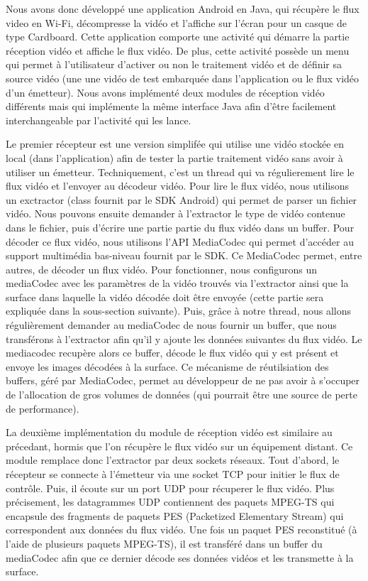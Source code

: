 \documentclass[11pt,a4paper]{article}
\begin{document}
\bigbreak
Nous avons donc développé une application Android en Java, qui récupère le flux video en Wi-Fi, décompresse la vidéo et l'affiche sur l'écran pour un casque de type Cardboard.
Cette application comporte une activité qui démarre la partie réception vidéo et affiche le flux vidéo. De plus, cette activité possède un menu qui permet à l'utilisateur d'activer ou non le traitement vidéo et de définir sa source vidéo (une une vidéo de test embarquée dans l'application ou le flux vidéo d'un émetteur).
Nous avons implémenté deux modules de réception vidéo différents mais qui implémente la même interface Java afin d'être facilement interchangeable par l'activité qui les lance.

\bigbreak
Le premier récepteur est une version simplifée qui utilise une vidéo stockée en local (dans l'application) afin de tester la partie traitement vidéo sans avoir à utiliser un émetteur.
Techniquement, c'est un thread qui va régulierement lire le flux vidéo et l'envoyer au décodeur vidéo. 
Pour lire le flux vidéo, nous utilisons un exctractor (class fournit par le SDK Android) qui permet de parser un fichier vidéo. Nous pouvons ensuite demander à l'extractor le type de vidéo contenue dans le fichier, puis d'écrire une partie partie du flux vidéo dans un buffer.
Pour décoder ce flux vidéo, nous utilisons l'API MediaCodec qui permet d'accéder au support multimédia bas-niveau fournit par le SDK. Ce MediaCodec permet, entre autres, de décoder un flux vidéo.
Pour fonctionner, nous configurons un mediaCodec avec les paramètres de la vidéo trouvés via l'extractor ainsi que la surface dans laquelle la vidéo décodée doit être envoyée (cette partie sera expliquée dans la sous-section suivante).
Puis, grâce à notre thread, nous allons régulièrement demander au mediaCodec de nous fournir un buffer, que nous transférons à l'extractor afin qu'il y ajoute les données suivantes du flux vidéo.
Le mediacodec recupère alors ce buffer, décode le flux vidéo qui y est présent et envoye les images décodées à la surface.
Ce mécanisme de réutilsiation des buffers, géré par MediaCodec, permet au développeur de ne pas avoir à s'occuper de l'allocation de gros volumes de données (qui pourrait être une source de perte de performance). 

\bigbreak
La deuxième implémentation du module de réception vidéo est similaire au précedant, hormis que l'on récupère le flux vidéo sur un équipement distant.
Ce module remplace donc l'extractor par deux sockets réseaux.
Tout d'abord, le récepteur se connecte à l'émetteur via une socket TCP pour initier le flux de contrôle.
Puis, il écoute sur un port UDP pour récuperer le flux vidéo.
Plus précisement, les datagrammes UDP contiennent des paquets MPEG-TS qui encapsule des fragments de paquets PES (Packetized Elementary Stream) qui correspondent aux données du flux vidéo.
Une fois un paquet PES reconstitué (à l'aide de plusieurs paquets MPEG-TS), il est transféré dans un buffer du mediaCodec afin que ce dernier décode ses données vidéos et les transmette à la surface.
\end{document}
